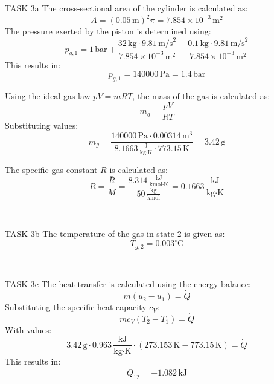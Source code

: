 TASK 3a  
The cross-sectional area of the cylinder is calculated as:  
\[
A = (0.05 \, \text{m})^2 \pi = 7.854 \times 10^{-3} \, \text{m}^2
\]  
The pressure exerted by the piston is determined using:  
\[
p_{g,1} = 1 \, \text{bar} + \frac{32 \, \text{kg} \cdot 9.81 \, \text{m/s}^2}{7.854 \times 10^{-3} \, \text{m}^2} + \frac{0.1 \, \text{kg} \cdot 9.81 \, \text{m/s}^2}{7.854 \times 10^{-3} \, \text{m}^2}
\]  
This results in:  
\[
p_{g,1} = 140000 \, \text{Pa} = 1.4 \, \text{bar}
\]  

Using the ideal gas law \( pV = mRT \), the mass of the gas is calculated as:  
\[
m_g = \frac{pV}{RT}
\]  
Substituting values:  
\[
m_g = \frac{140000 \, \text{Pa} \cdot 0.00314 \, \text{m}^3}{8.1663 \, \frac{\text{J}}{\text{kg·K}} \cdot 773.15 \, \text{K}} = 3.42 \, \text{g}
\]  

The specific gas constant \( R \) is calculated as:  
\[
R = \frac{\bar{R}}{M} = \frac{8.314 \, \frac{\text{kJ}}{\text{kmol·K}}}{50 \, \frac{\text{kg}}{\text{kmol}}} = 0.1663 \, \frac{\text{kJ}}{\text{kg·K}}
\]  

---

TASK 3b  
The temperature of the gas in state 2 is given as:  
\[
T_{g,2} = 0.003^\circ \text{C}
\]  

---

TASK 3c  
The heat transfer is calculated using the energy balance:  
\[
m (u_2 - u_1) = \dot{Q}
\]  
Substituting the specific heat capacity \( c_V \):  
\[
m c_V (T_2 - T_1) = \dot{Q}
\]  
With values:  
\[
3.42 \, \text{g} \cdot 0.963 \, \frac{\text{kJ}}{\text{kg·K}} \cdot (273.153 \, \text{K} - 773.15 \, \text{K}) = \dot{Q}
\]  
This results in:  
\[
\dot{Q}_{12} = -1.082 \, \text{kJ}
\]  